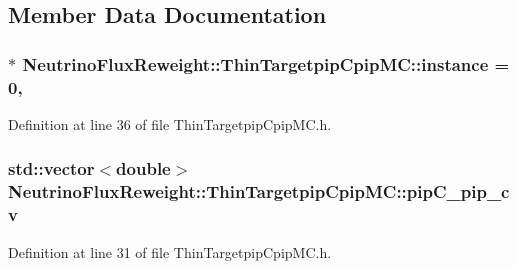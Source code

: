 \subsection{Member Data Documentation}
\hypertarget{class_neutrino_flux_reweight_1_1_thin_targetpip_cpip_m_c_a1d7a0728112de7b2ec773be8e7e1e44a}{
\subsubsection[{instance}]{ $\ast$ Neutrino\-Flux\-Reweight\-::\-Thin\-Targetpip\-Cpip\-M\-C\-::instance = 0\hspace{0.3cm}{\ttfamily [static]}, {\ttfamily [private]}}}\label{class_neutrino_flux_reweight_1_1_thin_targetpip_cpip_m_c_a1d7a0728112de7b2ec773be8e7e1e44a}


Definition at line 36 of file Thin\-Targetpip\-Cpip\-M\-C.\-h.

\hypertarget{class_neutrino_flux_reweight_1_1_thin_targetpip_cpip_m_c_ad8949d3657924de68ffab295b47b9ae5}{
\subsubsection[{pip\-C\-\_\-pip\-\_\-cv}]{\setlength{\rightskip}{0pt plus 5cm}std\-::vector$<$double$>$ Neutrino\-Flux\-Reweight\-::\-Thin\-Targetpip\-Cpip\-M\-C\-::pip\-C\-\_\-pip\-\_\-cv\hspace{0.3cm}{\ttfamily [private]}}}\label{class_neutrino_flux_reweight_1_1_thin_targetpip_cpip_m_c_ad8949d3657924de68ffab295b47b9ae5}


Definition at line 31 of file Thin\-Targetpip\-Cpip\-M\-C.\-h.

